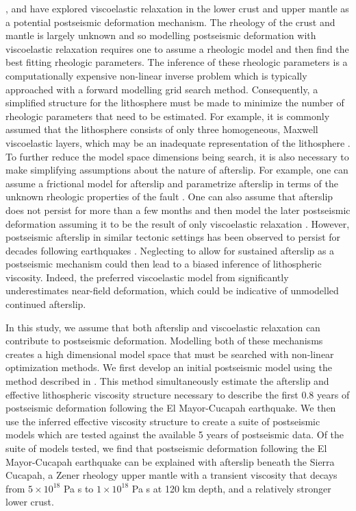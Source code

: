 \documentclass[1p]{elsarticle}
\begin{document}
\citet{Pollitz2012}, \citet{Rollins2015} and \citet{Spinler2015} have explored viscoelastic relaxation in the lower crust and upper mantle as a potential postseismic deformation mechanism. The rheology of the crust and mantle is largely unknown and so modelling postseismic deformation with viscoelastic relaxation requires one to assume a rheologic model and then find the best fitting rheologic parameters.  The inference of these rheologic parameters is a computationally expensive non-linear inverse problem which is typically approached with a forward modelling grid search method.  Consequently, a simplified structure for the lithosphere must be made to minimize the number of rheologic parameters that need to be estimated.  For example, it is commonly assumed that the lithosphere consists of only three homogeneous, Maxwell viscoelastic layers, which may be an inadequate representation of the lithosphere \citep[e.g.][]{Riva2009,Hines2013}. To further reduce the model space dimensions being search, it is also necessary to make simplifying assumptions about the nature of afterslip. For example, one can assume a frictional model for afterslip and parametrize afterslip in terms of the unknown rheologic properties of the fault \citep[e.g.][]{Johnson2009,Johnson2004}. One can also assume that afterslip does not persist for more than a few months and then model the later postseismic deformation assuming it to be the result of only viscoelastic relaxation \citep[e.g.][]{Pollitz2012,Spinler2015}. However, postseismic afterslip in similar tectonic settings has been observed to persist for decades following earthquakes \citep{Cakir2012,Cetin2014}. Neglecting to allow for sustained afterslip as a postseismic mechanism could then lead to a biased inference of lithospheric viscosity. Indeed, the preferred viscoelastic model from \citet{Pollitz2012} significantly underestimates near-field deformation, which could be indicative of unmodelled continued afterslip.

In this study, we assume that both afterslip and viscoelastic relaxation can contribute to postseismic deformation. Modelling both of these mechanisms creates a high dimensional model space that must be searched with non-linear optimization methods. We first develop an initial postseismic model using the method described in \citet{Hines2015}. This method simultaneously estimate the afterslip and effective lithospheric viscosity structure necessary to describe the first 0.8 years of postseismic deformation following the El Mayor-Cucapah earthquake.  We then use the inferred effective viscosity structure to create a suite of postseismic models which are tested against the available 5 years of postseismic data.  Of the suite of models tested, we find that postseismic deformation following the El Mayor-Cucapah earthquake can be explained with afterslip beneath the Sierra Cucapah, a Zener rheology upper mantle with a transient viscosity that decays from $5\times10^{18}$ Pa s to $1\times10^{18}$ Pa s at 120 km depth, and a relatively stronger lower crust. 
\end{document}
